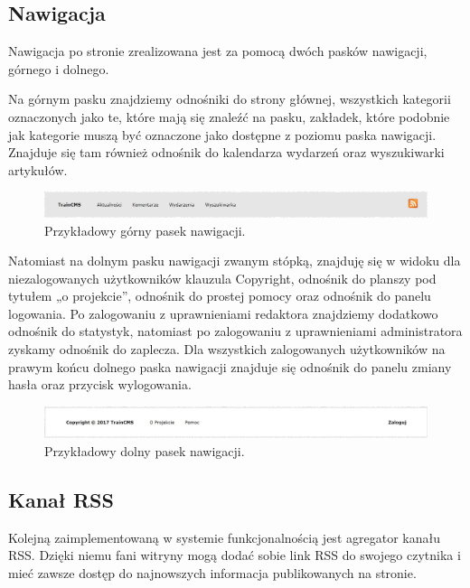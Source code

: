 \documentclass[openright]{xmgr}
\begin{document}
\newpage

\subsection{Nawigacja}
Nawigacja po stronie zrealizowana jest za pomocą dwóch pasków nawigacji, górnego i dolnego. 

Na górnym pasku znajdziemy odnośniki do strony głównej, wszystkich kategorii oznaczonych jako te, które mają się znaleźć na pasku, zakładek, które podobnie jak kategorie muszą być oznaczone jako dostępne z poziomu paska nawigacji. Znajduje się tam również odnośnik do kalendarza wydarzeń oraz wyszukiwarki artykułów.

\begin{figure}[!tbh]
\centering
\includegraphics[width=\linewidth]{fig/navbar}
\caption{Przykładowy górny pasek nawigacji.}
\end{figure}

Natomiast na dolnym pasku nawigacji zwanym stópką, znajduję się w widoku dla niezalogowanych użytkowników klauzula Copyright, odnośnik do planszy pod tytułem „o projekcie”, odnośnik do prostej pomocy oraz odnośnik do panelu logowania. Po zalogowaniu z uprawnieniami redaktora znajdziemy dodatkowo odnośnik do statystyk, natomiast po zalogowaniu z uprawnieniami administratora zyskamy odnośnik do zaplecza. Dla wszystkich zalogowanych użytkowników na prawym końcu dolnego paska nawigacji znajduje się odnośnik do panelu zmiany hasła oraz przycisk wylogowania.

\begin{figure}[!tbh]
\centering
\includegraphics[width=\linewidth]{fig/footbar}
\caption{Przykładowy dolny pasek nawigacji.}
\end{figure}

\newpage

\subsection{Kanał RSS}
Kolejną zaimplementowaną w systemie funkcjonalnością jest agregator kanału RSS. Dzięki niemu fani witryny mogą dodać sobie link RSS do swojego czytnika i mieć zawsze dostęp do najnowszych informacja publikowanych na stronie. 
\end{document}
